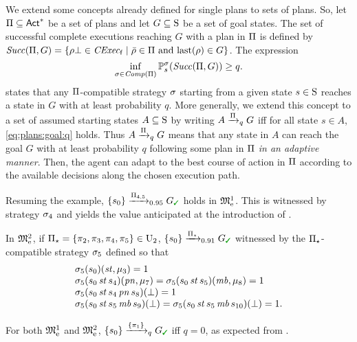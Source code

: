 We extend some concepts already defined for single plans to sets of
plans.  So, let $\plans\subseteq\Act^*$ be a set of plans and let 
$G\subseteq\S$ be a set of goal states.  The set of successful
complete executions reaching $G$ with a plan in $\plans$ is defined
by
$\Succ(\plans,G)=\{{\rho\complete\in\cexecf}\mid{\bar{\rho}\in\plans \text{ and } \last(\rho)\in G}\}$.
%
The expression
%
\begin{equation}\label{eq:plans:goal:q}
  \inf_{\strat \in\Comp(\plans)}\Prob^\strat_s(\Succ(\plans,G)) \geq q.
\end{equation}
%
states that any $\plans$-compatible strategy $\strat$
starting from a given state $s\in\S$ reaches a state in $G$ with at
least probability $q$.
%
More generally, we extend this concept to a set of assumed starting
states $A\subseteq\S$ by writing $A \reach{\plans}_q G$ iff for all
state $s\in A$, \cref{eq:plans:goal:q} holds.
%
Thus $A \reach{\plans}_q G$ means that any state in $A$ can reach the
goal $G$ with at least probability $q$ following some plan in $\plans$
\emph{in an adaptive manner}. Then, the agent can adapt to the best course of action in $\plans$ according to the available decisions along the chosen execution path.

\begin{example}\label{ex:running:plans-exec}
  Resuming the example, $\{s_0\}\reach{\plans_{4,5}}_{0.95}G_{\goal}$
  holds in $\modelex^1$.  This is witnessed by strategy $\strat_4$ and
  yields the value anticipated at the introduction of
  .

  In $\modelex^2$, if
  $\plans_{\star}=\{\plan_2,\plan_3,\plan_4,\plan_5\}\in\Unc_2$,
  ${\{s_0\}\reach{\plans_{\star}}_{0.91}G_{\goal}}$ witnessed
  by the $\plans_{\star}$-compatible strategy $\strat_5$ defined so that
  \[
  \begin{array}{l}
    \strat_5(s_0)(\stairs,\mu_3)=1\\
    \strat_5(s_0\,\stairs\,s_4)(\panic,\mu_7)=\strat_5(s_0\,\stairs\,s_5)(\mobile,\mu_8)=1\\
    \strat_5(s_0\,\stairs\,s_4\,\panic\,s_8)(\complete)=1\\
    \strat_5(s_0\,\stairs\,s_5\,\mobile\,s_9)(\complete)=
    \strat_5(s_0\,\stairs\,s_5\,\mobile\,s_{10})(\complete)=1.
  \end{array}
  \]
  
  For both $\modelex^1$ and $\modelex^2$,
  $\{s_0\}\reach{\{\plan_1\}}_qG_{\goal}$ iff $q=0$, as expected from
  .
\end{example}

